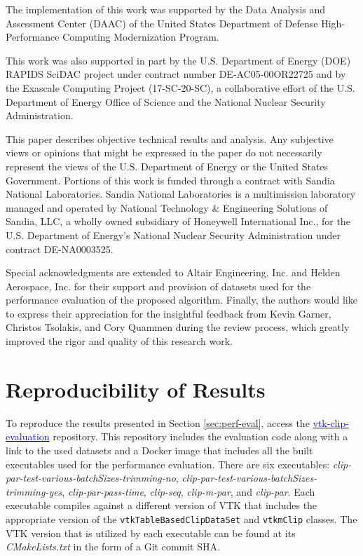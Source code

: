 \documentclass{egpubl}
\begin{document}
The implementation of this work was supported by the Data Analysis and Assessment Center (DAAC) of the United States Department of Defense High-Performance Computing Modernization Program.

This work was also supported in part by the U.S. Department of Energy (DOE) RAPIDS SciDAC project under contract number DE-AC05-00OR22725 and by the Exascale Computing Project (17-SC-20-SC), a collaborative effort of the U.S. Department of Energy Office of Science and the National Nuclear Security Administration.

This paper describes objective technical results and analysis.  Any subjective views or opinions that might be expressed in the paper do not necessarily represent the views of the U.S. Department of Energy or the United States Government.  Portions of this work is funded through a contract with Sandia National Laboratories.  Sandia National Laboratories is a multimission laboratory managed and operated by National Technology \& Engineering Solutions of Sandia, LLC, a wholly owned subsidiary of Honeywell International Inc., for the U.S. Department of Energy’s National Nuclear Security Administration under contract DE-NA0003525.

Special acknowledgments are extended to Altair Engineering, Inc. and Helden Aerospace,  Inc. for their support and provision of datasets used for the performance evaluation of the proposed algorithm. Finally, the authors  would like to express their appreciation for the insightful feedback from  Kevin Garner, Christos Tsolakis, and Cory Quammen during the review  process, which greatly improved the rigor and quality of this research work.

 
       


\pagebreak

\appendix
\section{Reproducibility of Results}
\label{sec:appendix}

To reproduce the results presented in Section \ref{sec:perf-eval}, access the \href{https://github.com/spyridon97/vtk-clip-evaluation}{\textcolor{blue}{vtk-clip-evaluation}} repository. This repository includes the evaluation code along with a link to the used datasets and a Docker image that includes all the built executables used for the performance evaluation. There are six executables: \textit{clip-par-test-various-batchSizes-trimming-no}, \textit{clip-par-test-various-batchSizes-trimming-yes}, \textit{clip-par-pass-time}, \textit{clip-seq}, \textit{clip-m-par}, and \textit{clip-par}. Each executable compiles against a different version of VTK that includes the appropriate version of the \texttt{vtkTableBasedClipDataSet} and \texttt{vtkmClip} classes. The VTK version that is utilized by each executable can be found at its \textit{CMakeLists.txt} in the form of a Git commit SHA.
\end{document}
